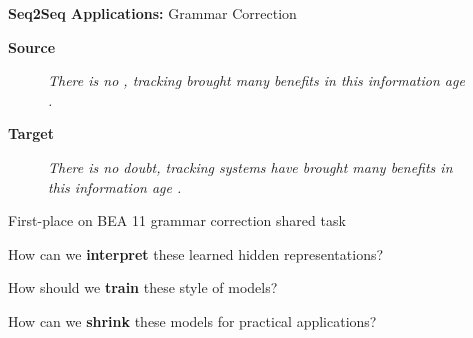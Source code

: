 \documentclass{beamer}
\let\tempone\itemize
\let\temptwo\enditemize
\renewenvironment{itemize}{\tempone\addtolength{\itemsep}{0.5\baselineskip}}{\temptwo}
\newcommand{\air}{\vspace{0.25cm}}
\newcommand{\mair}{\vspace{-0.25cm}}
\newcommand{\Cite}[1]{{\footnotesize \citep{#1}}}
\begin{document}
\begin{frame}
  \centerline{\textbf{Seq2Seq Applications:} \alert{Grammar Correction} \Cite{Schmaltz2016} }
  
  \begin{center}
    \textbf{Source}
  \end{center}
  
  \begin{figure}
    \textit{There is no , tracking  brought many benefits in this information
age . }
  \end{figure}

  \begin{center}
    \textbf{Target}
  \end{center}
  \mair

  \begin{figure}
    \centering
    \textit{There is no doubt, tracking systems have
      brought many benefits in this information
      age . }
  \end{figure}
  \pause

  \begin{itemize}
  \item First-place on BEA 11 grammar correction shared task \Cite{Daudaravicius2016}
  \end{itemize}
\end{frame}


\begin{frame}
  \centerline{}
  \air 
  \air

  \begin{itemize}
  \item How can we \textbf{interpret} these learned hidden representations? 
    \air 

    

  \item  How should we \textbf{train} these style of models? 
    \air 
  \item  How can we \textbf{shrink} these models for practical applications? 
  \end{itemize}
\end{frame}
\end{document}
